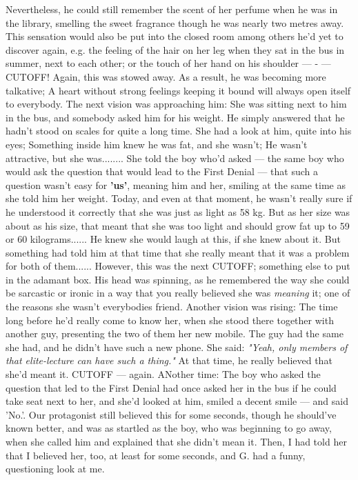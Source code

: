 Nevertheless, he could still remember the scent of her perfume when he was in the library, smelling the sweet fragrance though he was nearly two metres away. 
This sensation would also be put into the closed room among others he'd yet to discover again, e.g. the feeling of the hair on her leg when they sat in the bus in summer, next to each other; or the touch of her hand on his shoulder --- - --- CUTOFF!
Again, this was stowed away. 
As a result, he was becoming more talkative; A heart without strong feelings keeping it bound will always open itself to everybody. 
The next vision was approaching him: She was sitting next to him in the bus, and somebody asked him for his weight. He simply answered that he hadn't stood on scales for quite a long time. She had a look at him, quite into his eyes; Something inside him knew he was fat, and she wasn't; He wasn't attractive, but she was........
She told the boy who'd asked --- the same boy who would ask the question that would lead to the First Denial --- that such a question wasn't easy for \textbf{'us'}, meaning him and her, smiling at the same time as she told him her weight. Today, and even at that moment, he wasn't really sure if he understood it correctly that she was just as light as 58 kg. But as her size was about as his size, that meant that she was too light and should grow fat up to 59 or 60 kilograms......
He knew she would laugh at this, if she knew about it. But something had told him at that time that she really meant that it was a problem for both of them......
However, this was the next CUTOFF; something else to put in the adamant box. 
His head was spinning, as he remembered the way she could be sarcastic or ironic in a way that you really believed she was \emph{meaning} it; one of the reasons she wasn't everybodies friend. 
Another vision was rising: The time long before he'd really come to know her, when she stood there together with another guy, presenting the two of them her new mobile. The guy had the same she had, and he didn't have such a new phone. 
She said: \emph{"Yeah, only members of that elite-lecture can have such a thing."}
At that time, he really believed that she'd meant it. 
CUTOFF --- again. 
ANother time: The boy who asked the question that led to the First Denial had once asked her in the bus if he could take seat next to her, and she'd looked at him, smiled a decent smile --- and said 'No.'.
Our protagonist still believed this for some seconds, though he should've known better, and was as startled as the boy, who was beginning to go away, when she called him and explained that she didn't mean it. Then, I had told her that I believed her, too, at least for some seconds, and G. had a funny, questioning look at me. 
